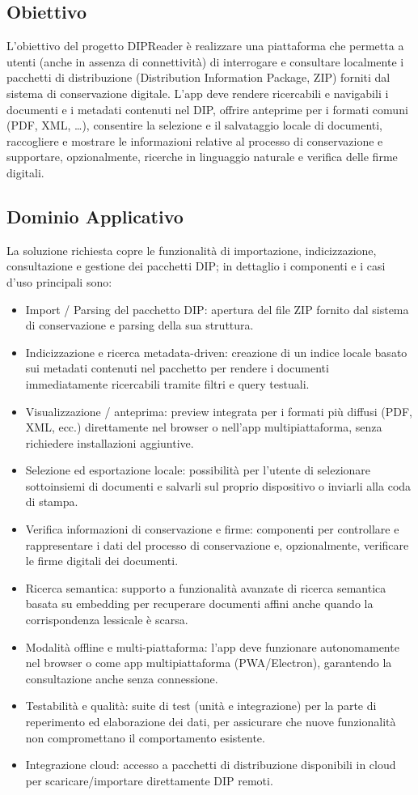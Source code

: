 \documentclass[a4paper,12pt]{article}
\begin{document}
    \subsection{Obiettivo}
    L’obiettivo del progetto DIPReader è realizzare una piattaforma che permetta a utenti (anche in assenza di connettività) di interrogare e consultare localmente i pacchetti di distribuzione (Distribution Information Package, ZIP) forniti dal sistema di conservazione digitale. L’app deve rendere ricercabili e navigabili i documenti e i metadati contenuti nel DIP, offrire anteprime per i formati comuni (PDF, XML, …), consentire la selezione e il salvataggio locale di documenti, raccogliere e mostrare le informazioni relative al processo di conservazione e supportare, opzionalmente, ricerche in linguaggio naturale e verifica delle firme digitali.
    \subsection{Dominio Applicativo}
    La soluzione richiesta copre le funzionalità di importazione, indicizzazione, consultazione e gestione dei pacchetti DIP; in dettaglio i componenti e i casi d’uso principali sono:
    \begin{itemize}
        \item Import / Parsing del pacchetto DIP: apertura del file ZIP fornito dal sistema di conservazione e parsing della sua struttura. 
        \item Indicizzazione e ricerca metadata-driven: creazione di un indice locale basato sui metadati contenuti nel pacchetto per rendere i documenti immediatamente ricercabili tramite filtri e query testuali. 
        \item Visualizzazione / anteprima: preview integrata per i formati più diffusi (PDF, XML, ecc.) direttamente nel browser o nell’app multipiattaforma, senza richiedere installazioni aggiuntive. 
        \item Selezione ed esportazione locale: possibilità per l’utente di selezionare sottoinsiemi di documenti e salvarli sul proprio dispositivo o inviarli alla coda di stampa. 
        \item Verifica informazioni di conservazione e firme: componenti per controllare e rappresentare i dati del processo di conservazione e, opzionalmente, verificare le firme digitali dei documenti. 
        \item Ricerca semantica: supporto a funzionalità avanzate di ricerca semantica basata su embedding per recuperare documenti affini anche quando la corrispondenza lessicale è scarsa. 
        \item Modalità offline e multi-piattaforma: l’app deve funzionare autonomamente nel browser o come app multipiattaforma (PWA/Electron), garantendo la consultazione anche senza connessione. 
        \item Testabilità e qualità: suite di test (unità e integrazione) per la parte di reperimento ed elaborazione dei dati, per assicurare che nuove funzionalità non compromettano il comportamento esistente. 
        \item Integrazione cloud: accesso a pacchetti di distribuzione disponibili in cloud per scaricare/importare direttamente DIP remoti.
    \end{itemize}
\end{document}
